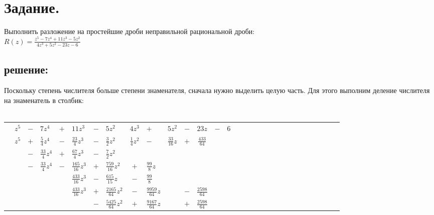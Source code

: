 \documentclass[12pt, a4paper]{article}
\begin{document}
\section{Задание.}
    Выполнить разложение на простейшие дроби неправильной рациональной дроби:\\
    $R(z) = \frac{z^5 - 7z^4 + 11z^3 - 5z^2}{4z^3 + 5z^2 - 23z - 6}$
    \subsection*{решение:}
    Поскольку степень числителя больше степени знаменателя, сначала
    нужно выделить целую часть. Для этого
    выполним деление числителя на знаменатель в столбик:\\\\
    \begin{spacing}{1.4}
        \begin{tabular}{*{15}{cp{0.55cm}}}
            &$z^5$             & $-$ & $7z^4$            & $+$ & $11z^3$             & $-$ & $5z^2$               &\vline   
            $4z^3$            & $+$ & $5z^2$            & $-$ & $23z$               & $-$ & $6$\\
            \cline{1-1}\cline{9-15}
            &$z^5$             & $+$ & $\frac{5}{4}z^4$  & $-$ & $\frac{23}{4}z^3$   & $-$ & $\frac{3}{2}z^2$     &\vline
            $\frac{1}{4}z^2$  & $-$ & $\frac{33}{16}z$  & $+$ & $\frac{433}{64}$    &     &\\
            \cline{2-8}
            &                  & $-$ & $\frac{33}{4}z^4$ & $+$ & $\frac{67}{4}z^3$   & $-$ & $\frac{7}{2}z^2$     &
                              &     &                   &     &                     &     &\\
            \cline{1-1}
            &                  & $-$ & $\frac{33}{4}z^4$ & $-$ & $\frac{165}{16}z^3$ & $+$ & $\frac{759}{16}z^2$  &
            $+$               & $\frac{99}{8}z$    &    &     &                     &     &\\
            \cline{4-10}
            &                  &     &                   &     & $\frac{433}{16}z^3$ & $-$ & $\frac{615}{15}z$    &
            $-$               & $\frac{99}{8}$     &    &     &                     &     &\\
            \cline{1-1}
            &                  &     &                   &     & $\frac{433}{16}z^3$ & $+$ & $\frac{2165}{64}z^2$ &
            $-$               & $\frac{9959}{64}z$ &    & $-$ & $\frac{2598}{64}$   &     &\\
            \cline{6-13}
            &                  &     &                   &     &                     & $-$ & $\frac{5425}{64}z^2$ &
            $+$               & $\frac{9167}{64}z$ &    & $+$ & $\frac{2598}{64}$   &     &\\
        \end{tabular}\\\\ 
    \end{spacing}
\end{document}
